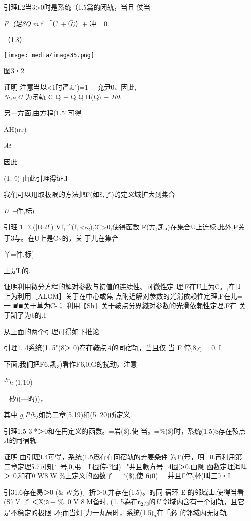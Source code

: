 \documentclass{article}
\begin{document}
引理L2当3\textgreater{}0时是系统（1.5爲的闭轨，当且 仗当

\emph{F（足8Q m} f ［（? + ⑦）+ 冲= 0.

（1.8）

\texttt{[image: media/image35.png]}

图3・2

证明 注意当\textbar{}以\textless{}1时\sout{严£")}=1 ---充尹0、因此,\\
\emph{"h,a,G} 为闭轨 G Q\textbar{} = Q Q H(Q\textbar{}) = \emph{H0.}

另一方面,由方程(1.5''可得

\textsc{{AH(ht)}}

\emph{At}

因此

(1. 9) 由此引理得证.I

我们可以用取极限的方法把F(如8,了)的定义域扩大到集合

\emph{U =}件,标)

引理 1. 3 ({[}Bo2{]})
Vf\textsubscript{1},\^{}(f\textsubscript{1}\textless{}r\textsubscript{2}),3\^{}\textgreater{}0,使得函数
F(方,凯。)在集合U上连续.此外,F关于3与。在U上是C\textasciitilde{}的，关
于儿在集合

丫=件,标)

上是L的.

证明利用微分方程的解对参数与初值的连续性、可微性定
理,F在U上为C。,在卩上为利用［ALGM］关于在中心或焦
点附近解对参数的光滑依赖性定理,F在儿=一 ■!■关于草为C-；
利用【Sh］关于鞍点分界綫对参数的光滑依赖性定理,F在 关于凯了为b的.I

从上面的两个引理可得如下推论.

引理1. 4系统(1. 5"(8＞ 0)存在鞍点\emph{A}的同宿轨，当且仅 当 F 停,8,q =
0. I

下面,我们把F6,凯，)看作F6,0,G的扰动，注意

\emph{\textsuperscript{Jr}h} (1.10)

=矽)(---旳))，

其中 \emph{g,P(h)}如第二章(5.19)和(5. 20)所定义.

引理1.5 3 *＞0和在円定义的函数。=岩(\$),使
当。=\%(\$)时，系统(1.5)\$存在鞍点\emph{A}的同宿轨.

证明 由引理L4可得，系统(1.5爲存在同宿轨的充要条件
为F(号，明=0.再利用第二章定理5.7可知』号,0,弔=
L囹传-?囹)="并且款方号=4囹＞0.由隐 函数定理洱叫＞ 0,和在0 W8 W
\%上定义的函数了 = *(\$),使 fi(0) = \textbar{}并且F停,杯(叫三0・I

引31.6存在曷＞0 (\& W务)，折＞0,并存在(1.5)。的同 宿环 E
的邻域山,使得当看(S) V 了 ＜X⑶+ \%, 0 V 8 M备时, (1.
5為在r\textsubscript{2/3}的\emph{U,}邻域内含有一个闭轨，且它是不稳定的极限
环;而当灯(力一丸咼时，系统(1.5)\textsubscript{a}在「必 的邻域内无闭轨.
\end{document}

